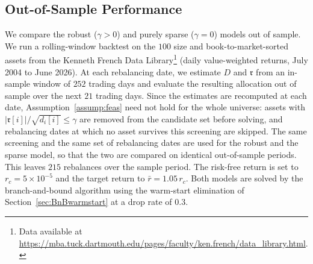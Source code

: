 \documentclass[11pt]{article}
\theoremstyle{plain}
\theoremstyle{definition}
\theoremstyle{plain}
\newcommand{\abs}[1]{\left\lvert#1\right\rvert}
\newcommand{\ccr}{{\mathfrak r}}
\begin{document}
\subsection{Out-of-Sample Performance}\label{sec:oos}
We compare the robust ($\gamma>0$) and purely sparse ($\gamma=0$) models out of sample. We run a rolling-window backtest on the $100$ size and book-to-market-sorted assets from the Kenneth French Data Library\footnote{Data available at \url{https://mba.tuck.dartmouth.edu/pages/faculty/ken.french/data_library.html}.}
 (daily value-weighted returns, {July 2004 to June 2026}). At each rebalancing date, we estimate $D$ and $\ccr$ from an in-sample window of $252$ trading days and evaluate the resulting allocation out of sample over the next $21$ trading days. Since the estimates are recomputed at each date, Assumption~\ref{assump:feas} need not hold for the whole universe: assets with $\abs{\ccr[i]}/\sqrt{d_i[i]}\leq\gamma$ are removed from the candidate set before solving, and rebalancing dates at which no asset survives this screening are skipped. The same screening and the same set of rebalancing dates are used for the robust and the sparse model, so that the two are compared on identical out-of-sample periods. This leaves $215$ rebalances over the sample period. The risk-free return is set to $r_c=5\times10^{-5}$ and the target return to $\bar r = 1.05\,r_c$. Both models are solved by the branch-and-bound algorithm using the warm-start elimination of Section~\ref{sec:BnBwarmstart} at a drop rate of $0.3$.
\end{document}
